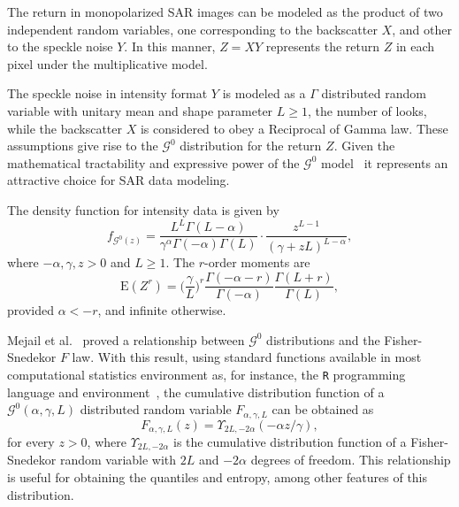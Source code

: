 \documentclass[twocolumn]{svjour3}
\begin{document}
	The return in monopolarized SAR images can be modeled as the product of two independent random variables, one corresponding to the backscatter $X$, and other to the speckle noise $Y$. 
	In this manner, $Z=X Y  $ represents the return $Z$ in each pixel under the multiplicative model.
	
	The speckle noise in intensity format $Y$ is modeled as a $\Gamma$ distributed random variable with unitary mean and shape parameter $L\geq1$, the number of looks, while the backscatter $X$ is considered to obey a Reciprocal of Gamma law. 
	These assumptions give rise to the $\mathcal{G}^{0}$ distribution for the return $Z$.
	Given the mathematical tractability and expressive power of the $\mathcal{G}^{0}$ model~\cite{MejailJacoboFreryBustos:IJRS,mejailfreryjacobobustos2001} it represents an attractive choice for SAR data modeling.
	
	The density function for intensity data is given by
	\begin{equation}
		f_{\mathcal{G}^{0}(z)} =\frac{L^{L}\Gamma ( L-\alpha
			) }{\gamma ^{\alpha }\Gamma ( -\alpha ) \Gamma (
			L) }\cdot  
		\frac{z^{L-1}}{( \gamma +zL) ^{L-\alpha }},%
		\label{ec_dens_gI0}
	\end{equation}
	where $-\alpha,\gamma ,z>0$ and $L\geq 1$. 
	The $r$-order moments are
	\begin{equation}
		\text{E}(Z^r) =\Big(\frac{\gamma}{L}\Big)^r\frac{\Gamma ( -\alpha-r )}{ \Gamma (-\alpha) }
		\frac{\Gamma (L+r )}{\Gamma (L)},
		\label{moments_gI0}
	\end{equation}
	provided $\alpha<-r$, and infinite otherwise.
	
	Mejail et al.~\cite{MejailJacoboFreryBustos:IJRS} proved a relationship between $\mathcal G^0$ distributions and the Fisher-Snedekor $F$ law.
	With this result, using standard functions available in most computational statistics environment as, for instance, the \texttt R programming language and environment~\cite{RLanguage}, the cumulative distribution function of a $\mathcal G^0(\alpha,\gamma,L)$ distributed random variable $F_{\alpha,\gamma,L}$ can be obtained as
	\begin{equation}
		F_{\alpha,\gamma,L}(z) = \Upsilon_{2L, -2\alpha}(-\alpha  z / \gamma),
		\label{eq:CDFG0}
	\end{equation}
	for every $z>0$, where $\Upsilon_{2L, -2\alpha}$ is the cumulative distribution function of a Fisher-Snedekor random variable with $2L$ and $-2\alpha$ degrees of freedom.
	This relationship is useful for obtaining the quantiles and entropy, among other features of this distribution.
	
\end{document}
